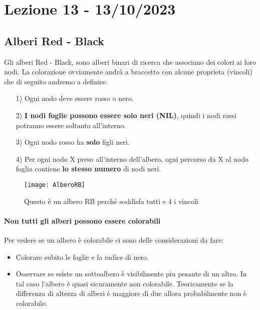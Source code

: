 \section{Lezione 13 - 13/10/2023}

\subsection{Alberi Red - Black}
Gli alberi Red - Black, sono alberi binari di ricerca che associano dei colori ai loro nodi. 
La colorazione ovviamente andrà a braccetto con alcune proprieta (vincoli) che di seguito andremo a definire.

\begin{itemize}	
	\item[1)] Ogni nodo deve essere rosso o nero.
	\item[2)] \textbf{I nodi foglie possono essere solo neri (NIL)}, quindi i nodi rossi potranno essere soltanto all'interno. 
	\item[3)] Ogni nodo rosso ha \textbf{solo} figli neri.
	\item[4)] Per ogni nodo X preso all'interno dell'albero, ogni percorso da X al nodo foglia contiene \textbf{lo stesso numero} di nodi neri.
\end{itemize}

\begin{figure}[H]
	\texttt{[image: AlberoRB]} 
	\caption{Questo è un albero RB perché soddisfa tutti e 4 i vincoli}
\end{figure}

\paragraph{Non tutti gli alberi possono essere colorabili}
\mbox{}
\smallskip

Per vedere se un albero è colorabile ci sono delle considerazioni da fare:

\begin{itemize}
    \item Colorare subito le foglie e la radice di nero.
    \item Osservare se esiste un sottoalbero è visibilmente piu pesante di un altro. In tal caso l'albero è quasi sicuramente non colorabile. Teoricamente se la differenza di altezza di alberi è maggiore di due allora probabilmente non è colorabile.
\end{itemize}

